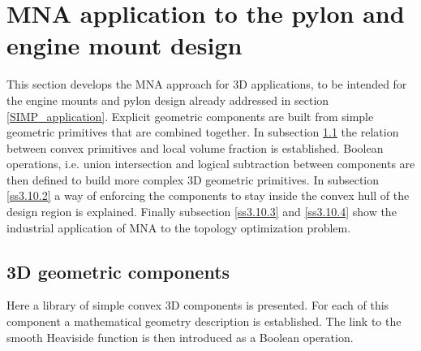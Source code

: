  \section{MNA application to the pylon and engine mount design}
 \label{MNA_application}
 This section develops the MNA approach for 3D applications, to be intended for the engine mounts and pylon design already addressed in section \ref{SIMP_application}. Explicit geometric components are built from simple geometric primitives that are combined together. In subsection \ref{ss3.10.1} the relation between convex primitives and local volume fraction is established. Boolean operations, i.e. union intersection and logical subtraction between components are then defined to build more complex 3D geometric primitives. In subsection \ref{ss3.10.2} a way of enforcing the components to stay inside the convex hull of the design region is explained. Finally subsection  \ref{ss3.10.3} and \ref{ss3.10.4} show the industrial application of MNA to the topology optimization problem. 
 \subsection{3D geometric components}
 \label{ss3.10.1}
 Here a library of simple convex 3D components is presented.
 For each of this component a mathematical geometry description is established. The link to the smooth Heaviside function is then introduced as a Boolean operation.
